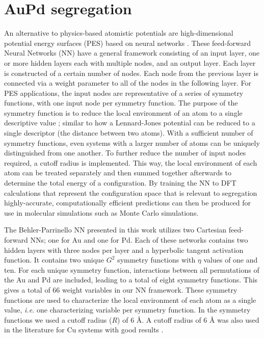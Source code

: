 \documentclass[12pt]{cmuthesis}
\begin{document}
\section{AuPd segregation}
\label{sec:org07ee503}
An alternative to physics-based atomistic potentials are  high-dimensional potential energy surfaces (PES) based on neural networks \cite{blank-1995-neural-networ,behler-2007-gener-neural}. These feed-forward Neural Networks (NN) have a general framework consisting of an input layer, one or more hidden layers each with multiple nodes, and an output layer. Each layer is constructed of a certain number of nodes. Each node from the previous layer is connected via a weight parameter to all of the nodes in the following layer. For PES applications, the input nodes are representative of a series of symmetry functions, with one input node per symmetry function. The purpose of the symmetry function is to reduce the local environment of an atom to a single descriptive value \cite{behler-2011-atom}; similar to how a Lennard-Jones potential can be reduced to a single descriptor (the distance between two atoms). With a sufficient number of symmetry functions, even systems with a larger number of atoms can be uniquely distinguished from one another. To further reduce the number of input nodes required, a cutoff radius is implemented. This way, the local environment of each atom can be treated separately and then summed together afterwards to determine the total energy of a configuration.  By training the NN to DFT calculations that represent the configuration space that is relevant to segregation highly-accurate, computationally efficient predictions can then be produced for use in molecular simulations such as Monte Carlo simulations.

The Behler-Parrinello NN \cite{behler-2007-gener-neural,behler-2011-atom} presented in this work utilizes two Cartesian feed-forward NNs; one for Au and one for Pd. Each of these networks contains two hidden layers with three nodes per layer and a hyperbolic tangent activation function. It contains two unique \(G^{2}\) symmetry functions with \(\eta\) values of one and ten. For each unique symmetry function, interactions between all permutations of the Au and Pd are included, leading to a total of eight symmetry functions. This gives a total of 66 weight variables in our NN framework. These symmetry functions are used to characterize the local environment of each atom as a single value, \emph{i.e.} one characterizing variable per symmetry function.  In the symmetry functions we used a cutoff radius (\(R\)) of 6 \AA{}.  A cutoff radius of 6 \AA{} was also used in the literature for Cu systems with good results \cite{artrith-2012-high}.
\end{document}
